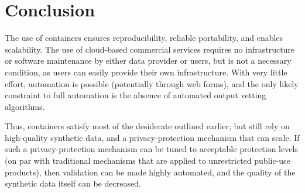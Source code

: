 \documentclass[]{hdsr}
\begin{document}
\section{Conclusion}

The use of containers ensures reproducibility, reliable portability, and enables scalability. The use of cloud-based commercial services requires no infrastructure or software maintenance by either data provider or users, but is not a necessary condition, as users can easily provide their own infrastructure. With very little effort, automation is possible (potentially through web forms), and the only likely constraint to full automation is the absence of automated output vetting algorithms. 

Thus, containers satisfy most of the desiderate outlined earlier, but still rely on high-quality synthetic data, and a privacy-protection mechanism that can scale. If such a privacy-protection mechanism can be tuned to acceptable protection levels (on par with traditional mechanisms that are applied to unrestricted public-use products), then validation can be made highly automated, and the quality of the synthetic data itself can be decreased. 

\end{document}
